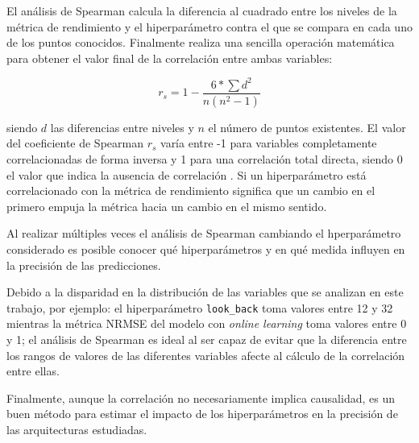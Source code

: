 El análisis de Spearman calcula la diferencia al cuadrado entre los niveles de la métrica de rendimiento y el hiperparámetro contra el que se compara en cada uno de los puntos conocidos. Finalmente realiza una sencilla operación matemática para obtener el valor final de la correlación entre ambas variables:

\begin{equation*}
	r_s=1-\frac{6*\sum d^2}{n(n^2-1)}
\end{equation*}


siendo $d$ las diferencias entre niveles y $n$ el número de puntos existentes. El valor del coeficiente de Spearman $r_s$ varía entre -1 para variables completamente correlacionadas de forma inversa y 1 para una correlación total directa, siendo 0 el valor que indica la ausencia de correlación \cite{spearmansource}. Si un hiperparámetro está correlacionado con la métrica de rendimiento significa que un cambio en el primero empuja la métrica hacia un cambio en el mismo sentido. 

Al realizar múltiples veces el análisis de Spearman cambiando el hperparámetro considerado es posible conocer qué hiperparámetros y en qué medida influyen en la precisión de las predicciones.

Debido a la disparidad en la distribución de las variables que se analizan en este trabajo, por ejemplo: el hiperparámetro \texttt{look\_back} toma valores entre 12 y 32 mientras la métrica NRMSE del modelo con \textit{online learning} toma valores entre 0 y 1; el análisis de Spearman es ideal al ser capaz de evitar que la diferencia entre los rangos de valores de las diferentes variables afecte al cálculo de la correlación entre ellas.

Finalmente, aunque la correlación no necesariamente implica causalidad, es un buen método para estimar el impacto de los hiperparámetros en la precisión de las arquitecturas estudiadas.




